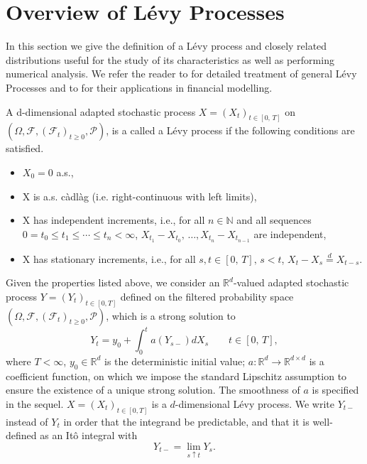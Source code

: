 \section{Overview of L\'evy Processes}\label{Section_Levy}
In this section we give the definition of a L\'evy process and closely related distributions useful for the study of its characteristics as well as performing numerical analysis. We refer the reader to  for detailed treatment of general L\'evy Processes and to  for their applications in financial modelling.
\begin{definition} A d-dimensional adapted stochastic process \break $X = (X_t)_{t \in [0, \, T]}$ on $(\Omega , \mathcal{F}, (\mathcal{F}_t)_{t \geq 0}, \mathcal{P})$, is a called a L\'evy process if the following conditions are satisfied.
\begin{itemize}
    \item $X_0 = 0 $ a.s.,
    \item X is a.s. c\`adl\`ag (i.e. right-continuous with left limits),
    \item X has independent increments, i.e., for all $ n \in \mathbb{N} $ and all sequences \break $0 = t_0 \leq t_1 \leq \cdots \leq t_n < \infty $, $X_{t_1} - X_{t_0}, \, \ldots, X_{t_n} - X_{t_{n-1}}$ are independent,
    \item X has stationary increments, i.e.,  for all $ s,t \in [0, \, T], \, s<t$, $ X_t - X_s \overset{d}{=} X_{t-s}$.
\end{itemize}
\end{definition}
Given the properties listed above, we consider an $\mathbb{R}^d$-valued adapted stochastic process $Y= (Y_t)_{t \in [0, T]}$ defined on the filtered probability space $(\Omega , \mathcal{F}, (\mathcal{F}_t)_{t \geq 0}, \mathcal{P})$, which is a strong solution to
\begin{equation}\label{eq_major}
      Y_t = y_0  + \int_0^t a(Y_{s-})dX_s \qquad t \in [0, \, T],
\end{equation}
where $T < \infty$, $y_0  \in \mathbb{R}^d$ is the deterministic initial value; $a : \mathbb{R}^d \to \mathbb{R}^{d \times d}
$ is a coefficient function, on which we impose the standard Lipschitz assumption to ensure the  existence of a unique strong  solution. The smoothness of $a$  is specified in the sequel. \break  $X=(X_t)_{t\in [0,T]}$ is a $d$-dimensional L\'evy process. We write ${Y}_{t-}$ instead of ${Y}_{t}$ in order that the integrand be predictable, and that it is well-defined as an It\^o integral with $${Y}_{t-} = \lim_{s \uparrow t}Y_s.$$
